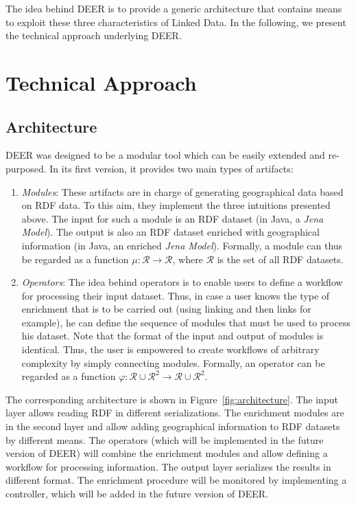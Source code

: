 \documentclass[a4paper,twoside,bibtotoc,abstracton,12pt,BCOR=15mm]{article}
\newcommand{\geolift}{\textsc{DEER}\xspace}
\begin{document}
The idea behind \geolift is to provide a generic architecture that contains means to exploit these three characteristics of Linked Data. 
In the following, we present the technical approach underlying \geolift.

\section{Technical Approach}
\subsection{Architecture}
\geolift was designed to be a modular tool which can be easily extended and re-purposed.
In its first version, it provides two main types of artifacts:
\begin{enumerate}
\item \emph{Modules}: These artifacts are in charge of generating geographical data based on RDF data. 
To this aim, they implement the three intuitions presented above.
The input for such a module is an RDF dataset (in Java, a \emph{Jena Model}).
The output is also an RDF dataset enriched with geographical information (in Java, an enriched \emph{Jena Model}).
Formally, a module can thus be regarded as a function $\mu: \mathcal{R} \rightarrow \mathcal{R}$, where $\mathcal{R}$ is the set of all RDF datasets.
\item \emph{Operators}: The idea behind operators is to enable users to define a workflow for processing their input dataset. 
Thus, in case a user knows the type of enrichment that is to be carried out (using linking and then links for example), he can define the sequence of modules that must be used to process his dataset.
Note that the format of the input and output of modules is identical. 
Thus, the user is empowered to create workflows of arbitrary complexity by simply connecting modules.
Formally, an operator can be regarded as a function $\varphi: \mathcal{R} \cup \mathcal{R}^2 \rightarrow \mathcal{R} \cup \mathcal{R}^2$.
\end{enumerate}
The corresponding architecture is shown in Figure~\ref{fig:architecture}. The input layer allows reading RDF in different serializations.
The enrichment modules are in the second layer and allow adding geographical information to RDF datasets by different means.
The operators (which will be implemented in the future version of \geolift) will combine the enrichment modules and allow defining a workflow for processing information.
The output layer serializes the results in different format.
The enrichment procedure will be monitored by implementing a controller, which will be added in the future version of \geolift.
\end{document}
